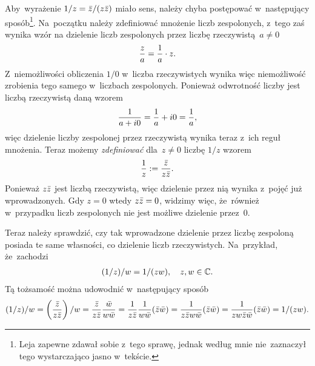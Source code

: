 \documentclass[a4paper,11pt]{article}
\begin{document}
\start {} Aby~wyrażenie $1 / z = \bar{ z } / ( z \bar{ z } )$ miało
sens, należy chyba postępować w~następujący sposób\footnote{Leja
  zapewne zdawał sobie z~tego sprawę, jednak według mnie nie~zaznaczył
  tego wystarczająco jasno w~tekście.}. Na~początku należy zdefiniować
mnożenie liczb zespolonych, z~tego zaś wynika wzór na dzielenie liczb
zespolonych przez liczbę rzeczywistą~$a \neq 0$
\begin{equation}
  \label{eq:Leja-01}
  \begin{split}
    \frac{ z }{ a } = \frac{ 1 }{  a  } \cdot z.
  \end{split}
\end{equation}
Z~niemożliwości obliczenia $1 / 0$ w~liczba rzeczywistych wynika więc
niemożliwość zrobienia tego samego w~liczbach zespolonych. Ponieważ
odwrotność liczby jest liczbą rzeczywistą daną wzorem
\begin{equation}
  \label{eq:Leja-02}
  \begin{split}
    \frac{ 1 }{  a + i0  } = \frac{ 1 }{  a  } + i0 = \frac{ 1 }{  a  },
  \end{split}
\end{equation}
więc dzielenie liczby zespolonej przez rzeczywistą wynika teraz z~ich
reguł mnożenia. Teraz możemy \emph{zdefiniować} dla~$z \neq 0$ liczbę
$1 / z$ wzorem
\begin{equation}
  \label{eq:Leja-03}
  \begin{split}
    \frac{ 1 }{  z  } := \frac{ \bar{ z } }{ z \bar{ z } }.
  \end{split}
\end{equation}
Ponieważ $z \bar{ z }$ jest liczbą rzeczywistą, więc dzielenie przez nią
wynika z~pojęć już wprowadzonych. Gdy $z = 0$ wtedy $z \bar{ z } = 0$,
widzimy więc, że~również w~przypadku liczb zespolonych nie jest
możliwe dzielenie przez~0.

Teraz należy sprawdzić, czy tak wprowadzone dzielenie przez liczbę
zespoloną posiada te same własności, co dzielenie liczb rzeczywistych.
Na~przykład, że~zachodzi
\begin{equation}
  \label{eq:Leja-04}
  \begin{split}
    ( 1 / z ) / w = 1 / ( z w ), \quad z, w \in \mathbb{C}.
  \end{split}
\end{equation}
Tą tożsamość można udowodnić w~następujący sposób
\begin{equation}
  \label{eq:Leja-05}
  \begin{split}
    ( 1 / z ) / w = \left( \frac{ \bar{ z } }{ z \bar{ z } } \right) / w = \frac{
      \bar{ z } }{ z \bar{ z } } \frac{ \bar{ w } }{ w \bar{ w } } = \frac{ 1 }{  z \bar{ z }  }
    \frac{ 1 }{  w \bar{ w }  } ( \bar{ z } \bar{ w } ) = \frac{ 1 }{  z \bar{ z } w \bar{ w }  } (
    \bar{ z } \bar{ w } ) = \frac{ 1 }{  z w \bar{ z } \bar{ w }  } ( \bar{ z } \bar{ w } ) = 1 / (
    z w ).
  \end{split}
\end{equation}
\end{document}
